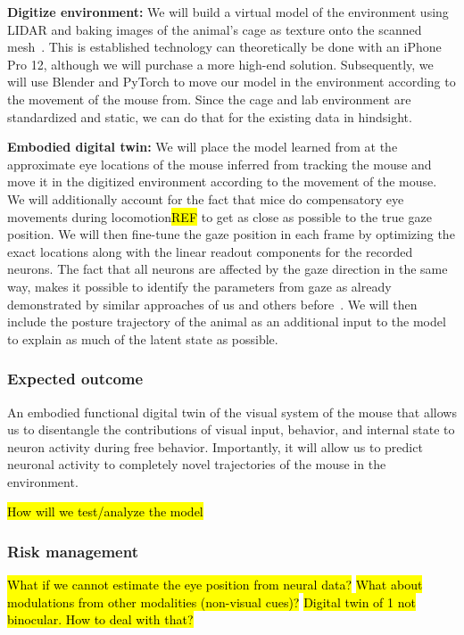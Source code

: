 \documentclass[B2,COG]{ercgrant}
\begin{document}
\textbf{Digitize environment:} 
We will build a virtual model of the environment using LIDAR and baking images of the animal's cage as texture onto the scanned mesh~\parencite[similar as in][]{Holmgren2021-jv}.
This is established technology can theoretically be done with an iPhone Pro 12, although we will purchase a more high-end solution.
Subsequently, we will use Blender and PyTorch to move our model in the environment according to the movement of the mouse from.
Since the cage and lab environment are standardized and static, we can do that for the existing data in hindsight.

\textbf{Embodied digital twin:} We will place the model learned from  at the approximate eye locations of the mouse inferred from tracking the mouse and move it in the digitized environment according to the movement of the mouse. 
We will additionally account for the fact that mice do compensatory eye movements during locomotion\hl{REF} to get as close as possible to the true gaze position. 
We will then fine-tune the gaze position in each frame by optimizing the exact locations along with the linear readout components for the recorded neurons. 
The fact that all neurons are affected by the gaze direction in the same way, makes it possible to identify the parameters from gaze as already demonstrated by similar approaches of us and others before~\parencite{Sinz2018-sk,Walker2019-yw,Parker2022-ac}.
We will then include the posture trajectory of the animal as an additional input to the model to explain as much of the latent state as possible. 

\subsubsection{Expected outcome} 

An embodied functional digital twin of the visual system of the mouse that allows us to disentangle the contributions of visual input, behavior, and internal state to neuron activity during free behavior. 
Importantly, it will allow us to predict neuronal activity to completely novel trajectories of the mouse in the environment.

\hl{How will we test/analyze the model}

\subsubsection{Risk management} 
\hl{What if we cannot estimate the eye position from neural data?}
\hl{What about modulations from other modalities (non-visual cues)?}
\hl{Digital twin of 1 not binocular. How to deal with that?}
\end{document}
